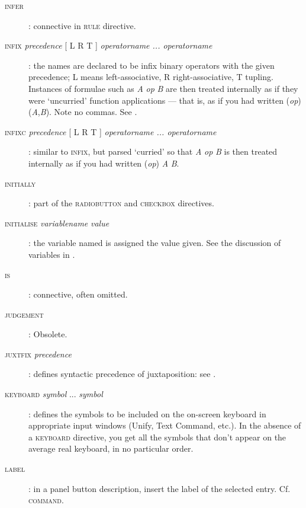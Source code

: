 \begin{description}
\item[\textsc{ infer }]: connective in \textsc{rule} directive.

\item[\textsc{infix} \textit{precedence} \textsc{[} L {\textbar} R {\textbar} T \textsc{]} \textit{operatorname ... operatorname}]: the names are declared to be infix binary operators with the given precedence; L means left-associative, R right-associative, T tupling. Instances of formulae such as \textit{A} \textit{op} \textit{B} are then treated internally as if they were `uncurried' function applications --- that is, as if you had written (\textit{op})(\textit{A},\textit{B}). Note no commas. See .

\item[\textsc{infixc} \textit{precedence} \textsc{[} L {\textbar} R {\textbar} T \textsc{]} \textit{operatorname ... operatorname}]: similar to \textsc{infix}, but parsed `curried' so that \textit{A} \textit{op} \textit{B} is then treated internally as if you had written (\textit{op}) \textit{A} \textit{B}.

\item[\textsc{initially}]: part of the \textsc{radiobutton} and \textsc{checkbox} directives.

\item[\textsc{initialise} \textit{variablename} \textit{value}]: the variable named is assigned the value given. See the discussion of variables in .

\item[\textsc{is}]: connective, often omitted.

\item[\textsc{judgement}]: Obsolete.

\item[\textsc{juxtfix} \textit{precedence}]: defines syntactic precedence of juxtaposition: see .

\item[\textsc{keyboard} \textit{symbol} ... \textit{symbol}]: defines the symbols to be included on the on-screen keyboard in appropriate input windows (Unify, Text Command, etc.). In the absence of a \textsc{keyboard} directive, you get all the symbols that don't appear on the average real keyboard, in no particular order.

\item[\textsc{label}]: in a panel button description, insert the label of the selected entry. Cf. \textsc{command}.


\end{description}
